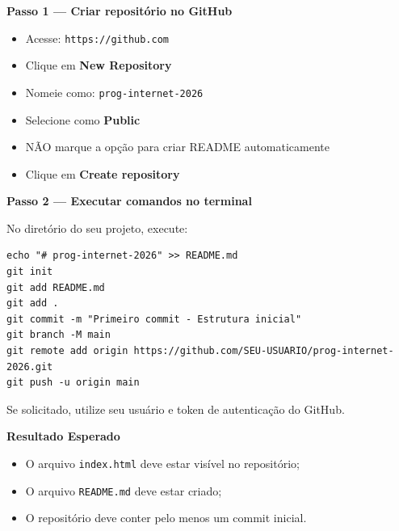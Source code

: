 \documentclass[12pt,a4paper]{article}
\begin{document}
\begin{boxAtividade}

\textbf{Passo 1 — Criar repositório no GitHub}

\begin{itemize}
\item Acesse: \texttt{https://github.com}
\item Clique em \textbf{New Repository}
\item Nomeie como: \texttt{prog-internet-2026}
\item Selecione como \textbf{Public}
\item NÃO marque a opção para criar README automaticamente
\item Clique em \textbf{Create repository}
\end{itemize}

\vspace{0.5cm}

\textbf{Passo 2 — Executar comandos no terminal}

No diretório do seu projeto, execute:

\begin{boxCodigo}
\begin{verbatim}
echo "# prog-internet-2026" >> README.md
git init
git add README.md
git add .
git commit -m "Primeiro commit - Estrutura inicial"
git branch -M main
git remote add origin https://github.com/SEU-USUARIO/prog-internet-2026.git
git push -u origin main
\end{verbatim}
\end{boxCodigo}

Se solicitado, utilize seu usuário e token de autenticação do GitHub.

\vspace{0.5cm}

\textbf{Resultado Esperado}

\begin{itemize}
\item O arquivo \texttt{index.html} deve estar visível no repositório;
\item O arquivo \texttt{README.md} deve estar criado;
\item O repositório deve conter pelo menos um commit inicial.
\end{itemize}

\end{boxAtividade}

\vspace{0.5cm}
\end{document}
